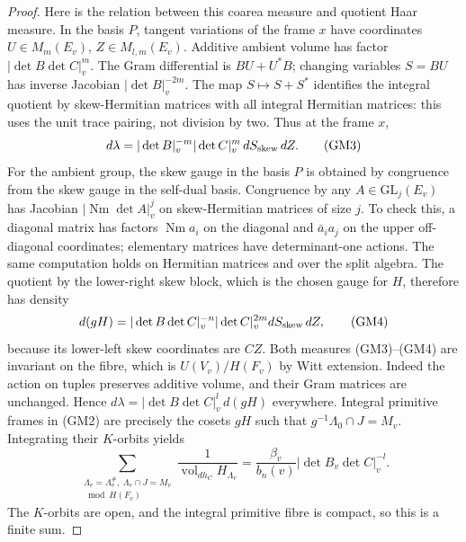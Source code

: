 \begin{proof}
Here is the relation between this coarea measure and
quotient Haar measure. In the basis \(P\), tangent variations
of the frame \(x\) have coordinates \(U\in M_m(E_v)\),
\(Z\in M_{l,m}(E_v)\). Additive ambient volume has factor
\(|\det B\det C|_v^m\). The Gram differential is
\(BU+U^*B\); changing variables \(S=BU\) has inverse
Jacobian \(|\det B|_v^{-2m}\).
The map \(S\mapsto S+S^*\) identifies the integral
quotient by skew-Hermitian matrices with all integral
Hermitian matrices: this uses the unit trace pairing, not
division by two. Thus at the frame \(x\),
\[
 d\lambda=|\det B|_v^{-m}|\det C|_v^m\,
              dS_{\rm skew}\,dZ.
 \tag{GM3}
\]
For the ambient group, the skew gauge in the basis \(P\)
is obtained by congruence from the skew gauge in the
self-dual basis. Congruence by any \(A\in\mathrm{GL}_j(E_v)\)
has Jacobian \(|\operatorname{Nm}\det A|_v^j\) on
skew-Hermitian matrices of size \(j\). To check this,
a diagonal matrix has factors \(\operatorname{Nm}a_i\)
on the diagonal and \(\bar a_i a_j\) on the upper
off-diagonal coordinates; elementary matrices have
determinant-one actions. The same computation holds on
Hermitian matrices and over the split algebra.
The quotient by the lower-right skew block, which is the
chosen gauge for \(H\), therefore has density
\[
 d(gH)=|\det B\det C|_v^{-n}|\det C|_v^{2m}
            dS_{\rm skew}\,dZ,
 \tag{GM4}
\]
because its lower-left skew coordinates are \(CZ\).
Both measures (GM3)--(GM4) are invariant on the fibre,
which is \(U(V_v)/H(F_v)\) by Witt extension. Indeed
the action on tuples preserves additive volume, and their
Gram matrices are unchanged. Hence
\(d\lambda=|\det B\det C|_v^l\,d(gH)\) everywhere.
Integral primitive frames in (GM2) are precisely the
cosets \(gH\) such that \(g^{-1}\Lambda_0\cap J=M_v\).
Integrating their \(K\)-orbits yields
\[
 \sum_{\substack{\Lambda_v=\Lambda_v^\#,\ \Lambda_v\cap J=M_v\\
                   {}\bmod H(F_v)}}
 \frac1{\operatorname{vol}_{dh_C} H_{\Lambda_v}}
       = \frac{\beta_v}{b_n(v)}|\det B_v\det C|_v^{-l}.
 \tag{GM5}
\]
The \(K\)-orbits are open, and the integral primitive
fibre is compact, so this is a finite sum.


\end{proof}
